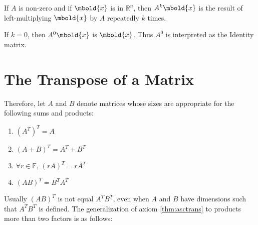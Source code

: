 \documentclass[12pt letter]{report}
\begin{document}

If $A$ is non-zero and if $\mbold{x}$ is in $\mathbb{R}^{n}$, then $A^{k} \mbold{x}$ is the result of left-multiplying
$\mbold{x}$ by $A$ repeatedly $k$ times.

If $k = 0$, then $A^{0} \mbold{x}$ is $\mbold{x}$. Thus $A^{0}$ is interpreted as the Identity matrix.

\section{The Transpose of a Matrix}


Therefore, let $A$ and $B$ denote matrices whose sizes are appropriate for the following sums and products:
\begin{enumerate}
  \item $ \left( A^{T} \right)^{T} = A$
  \item $ \left( A + B \right)^{T} = A^{T} + B^{T} $
  \item $\forall r \in \mathbb{F}, \, \left( r A \right)^{T} = r A^{T}  $
  \item $ \left( A B \right)^{T} = B ^{T} A^{T} $ \label{thm:asctrans}
\end{enumerate}

Usually $ \left( A B \right)^{T} $ is not equal $A ^{T} B^{T}$, even when $A$ and $B$ have dimensions such that $A ^{T}
  B^{T}$ is defined. The generalization of axiom \ref{thm:asctrans} to products more than two factors is as follows:

\end{document}

